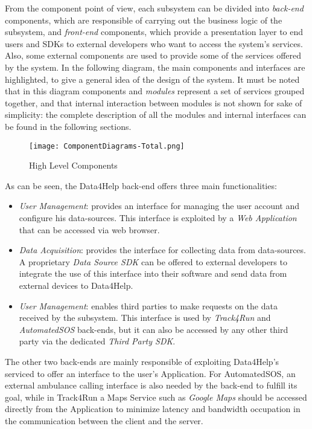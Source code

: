 From the component point of view, each subsystem can be divided into \textit{back-end} components, which are responsible of carrying out the business logic of the subsystem, and \textit{front-end} components, which provide a presentation layer to end users and SDKs to external developers who want to access the system's services.
Also, some external components are used to provide some of the services offered by the system.
In the following diagram, the main components and interfaces are highlighted, to give a general idea of the design of the system.
It must be noted that in this diagram components and \textit{modules} represent a set of services grouped together, and that internal interaction between modules is not shown for sake of simplicity: the complete description of all the modules and internal interfaces can be found in the following sections.

\FloatBarrier
\begin{figure}[!h]
	\centering
	\texttt{[image: ComponentDiagrams-Total.png]}
	\caption{High Level Components}
\end{figure}
\FloatBarrier

As can be seen, the Data4Help back-end offers three main functionalities:

\begin{itemize}
	\item \textit{User Management}: provides an interface for managing the user account and configure his data-sources. This interface is exploited by a \textit{Web Application} that can be accessed via web browser.
	\item \textit{Data Acquisition}: provides the interface for collecting data from data-sources. A proprietary \textit{Data Source SDK} can be offered to external developers to integrate the use of this interface into their software and send data from external devices to Data4Help.
	\item \textit{User Management}: enables third parties to make requests on the data received by the subsystem. This interface is used by \textit{Track4Run} and \textit{AutomatedSOS} back-ends, but it can also be accessed by any other third party via the dedicated \textit{Third Party SDK}.
\end{itemize}

The other two back-ends are mainly responsible of exploiting Data4Help's serviced to offer an interface to the user's Application. 
For AutomatedSOS, an external ambulance calling interface is also needed by the back-end to fulfill its goal, while in Track4Run a Maps Service such as \textit{Google Maps} should be accessed directly from the Application to minimize latency and bandwidth occupation in the communication between the client and the server.

